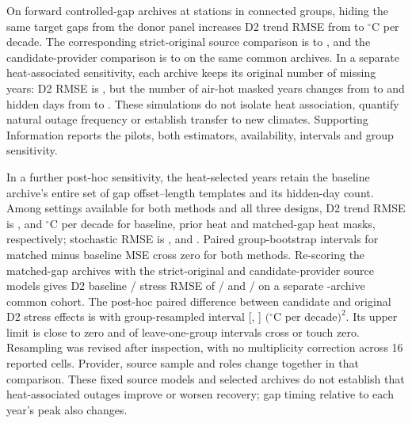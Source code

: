 \documentclass[draft,linenumbers]{agujournal2025}
\begin{document}
On \ESArchives{} forward controlled-gap archives at \ESStations{} stations in \ESGroups{} connected groups, hiding the same target gaps from the donor panel increases D2 trend RMSE from \ESBaseline{} to \ESDonor{} $^{\circ}$C per decade. The corresponding strict-original source comparison is \SDSStrictBase{} to \SDSStrictDonor{}, and the candidate-provider comparison is \SDSCandidateBase{} to \SDSCandidateDonor{} on the same \SDSCases{} common archives. In a separate heat-associated sensitivity, each archive keeps its original number of missing years: D2 RMSE is \ESHeat{}, but the number of air-hot masked years changes from \ESHotBaseline{} to \ESHotHeat{} and hidden days from \ESDaysBaseline{} to \ESDaysHeat{}. These simulations do not isolate heat association, quantify natural outage frequency or establish transfer to new climates. Supporting Information reports the pilots, both estimators, availability, intervals and group sensitivity.

In a further post-hoc sensitivity, the heat-selected years retain the baseline archive's entire set of gap offset--length templates and its hidden-day count. Among \HGArchives{} settings available for both methods and all three designs, D2 trend RMSE is \HGDBase{}, \HGDPrevious{} and \HGDMatched{} $^{\circ}$C per decade for baseline, prior heat and matched-gap heat masks, respectively; stochastic RMSE is \HGSBase{}, \HGSPrevious{} and \HGSMatched{}. Paired group-bootstrap intervals for matched minus baseline MSE cross zero for both methods. Re-scoring the matched-gap archives with the strict-original and candidate-provider source models gives D2 baseline / stress RMSE of \HGRDRBase{} / \HGRDRStress{} and \HGRDCBase{} / \HGRDCStress{} on a separate \HGRCases{}-archive common cohort. The post-hoc paired difference between candidate and original D2 stress effects is \HGRInteraction{} with group-resampled interval [\HGRInteractionLow, \HGRInteractionHigh] $({}^{\circ}$C per decade$)^2$. Its upper limit is close to zero and \HGRInfluenceCross{} of \HGRInfluenceGroups{} leave-one-group intervals cross or touch zero. Resampling was revised after inspection, with no multiplicity correction across 16 reported cells. Provider, source sample and roles change together in that comparison. These fixed source models and selected archives do not establish that heat-associated outages improve or worsen recovery; gap timing relative to each year's peak also changes.
\end{document}
